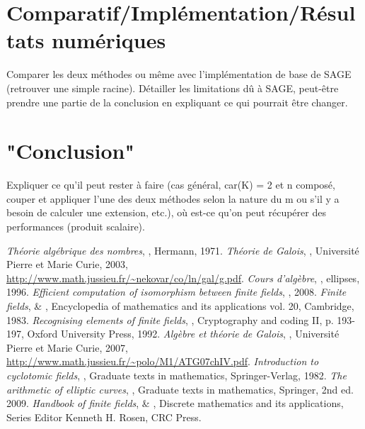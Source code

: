 \documentclass[a4paper]{article} %
\numberwithin{equation}{section}
\begin{document}
\section{Comparatif/Implémentation/Résultats numériques}
Comparer les deux méthodes ou même avec l'implémentation de base de SAGE 
(retrouver une simple racine). Détailler les limitations dû à SAGE, peut-être
prendre une partie de la conclusion en expliquant ce qui pourrait être changer.

\section{"Conclusion"}
Expliquer ce qu'il peut rester à faire (cas général, car(K) = 2 et n 
composé, couper et appliquer l'une des deux méthodes selon la nature du m ou 
s'il y a besoin de calculer une extension, etc.), où est-ce qu'on peut 
récupérer des performances (produit scalaire).

\begin{thebibliography}{LC}
 \emph{Théorie algébrique des nombres}, , Hermann, 1971.
 \emph{Théorie de Galois}, , Université Pierre et Marie Curie, 2003,  \url{http://www.math.jussieu.fr/~nekovar/co/ln/gal/g.pdf}.
 \emph{Cours d'algèbre}, , ellipses, 1996.
 \emph{Efficient computation of isomorphism between finite fields}, , 2008.
 \emph{Finite fields},  \& , Encyclopedia of mathematics and its applications vol. 20, Cambridge, 1983.
 \emph{Recognising elements of finite fields}, , Cryptography and coding II, p. 193-197, Oxford University Press, 1992.
 \emph{Algèbre et théorie de Galois}, , Université Pierre et Marie Curie, 2007,  \url{http://www.math.jussieu.fr/~polo/M1/ATG07chIV.pdf}.
 \emph{Introduction to cyclotomic fields}, , Graduate texts in mathematics, Springer-Verlag, 1982.
 \emph{The arithmetic of elliptic curves}, , Graduate texts in mathematics, Springer, 2nd ed. 2009.
 \emph{Handbook of finite fields},  \& , Discrete mathematics and its applications, Series Editor Kenneth H. Rosen, CRC Press.
\end{thebibliography}
\end{document}
